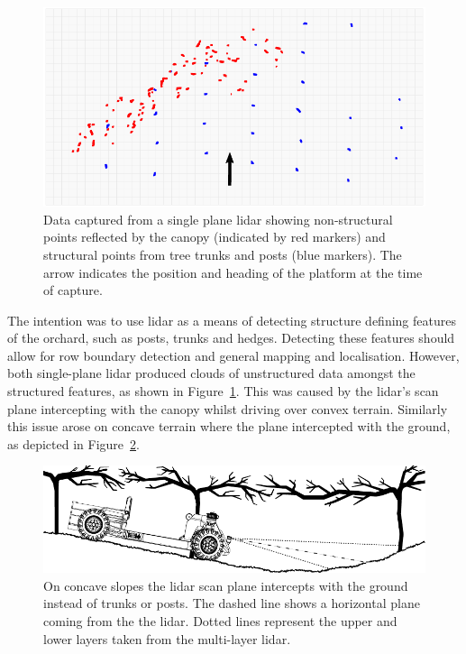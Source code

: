 \documentclass[preprint,authoryear,12pt]{elsarticle}
\begin{document}
        \begin{figure}[htb]
            \centering
            \includegraphics[width=\linewidth]{imgs/canopy_data/canopy_data.pdf}
            \caption{
                Data captured from a single plane lidar showing non-structural points reflected by the canopy (indicated by red markers) and structural points from tree trunks and posts (blue markers).
                The arrow indicates the position and heading of the platform at the time of capture.
            }
            \label{fig:canopyDataCloud}
        \end{figure}

        The intention was to use lidar as a means of detecting structure defining features of the orchard, such as posts, trunks and hedges.
        Detecting these features should allow for row boundary detection and general mapping and localisation.
        However, both single-plane lidar produced clouds of unstructured data amongst the structured features, as shown in Figure~\ref{fig:canopyDataCloud}.
        This was caused by the lidar's scan plane intercepting with the canopy whilst driving over convex terrain.
        Similarly this issue arose on concave terrain where the plane intercepted with the ground, as depicted in Figure~\ref{fig:concaveSlope}.

        \begin{figure}[htb]
            \centering
            \includegraphics[width=\linewidth]{imgs/concave_slope/concave_slope_v4.pdf}
            \caption{
                On concave slopes the lidar scan plane intercepts with the ground instead of trunks or posts.
                The dashed line shows a horizontal plane coming from the the lidar.
                Dotted lines represent the upper and lower layers taken from the multi-layer lidar.
            }
            \label{fig:concaveSlope}
        \end{figure}
\end{document}
